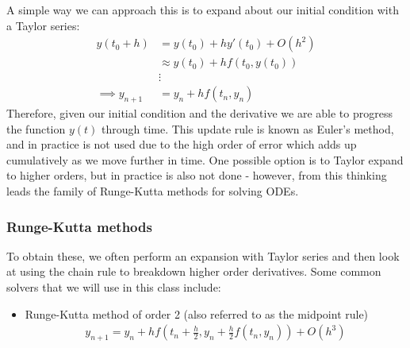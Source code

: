 \documentclass[11pt,a4paper]{report}
\begin{document}
			A simple way we can approach this is to expand about our initial condition with a Taylor series:
			\begin{align}
				y(t_0 + h) &= y(t_0) + hy'(t_0) + O(h^2) \\
				&\approx y(t_0) + h f(t_0, y(t_0)) \\
				&\vdots \\
				\implies y_{n+1} &= y_n + hf(t_n, y_n)
			\end{align}
			Therefore, given our initial condition and the derivative we are able to progress the function $y(t)$ through time. This update rule is known as Euler's method, and in practice is not used due to the high order of error which adds up cumulatively as we move further in time. One possible option is to Taylor expand to higher orders, but in practice is also not done - however, from this thinking leads the family of Runge-Kutta methods for solving ODEs.
			
			\subsubsection{Runge-Kutta methods}
			To obtain these, we often perform an expansion with Taylor series and then look at using the chain rule to breakdown higher order derivatives. Some common solvers that we will use in this class include:
			\begin{itemize}
				\item Runge-Kutta method of order 2 (also referred to as the midpoint rule)
				\begin{align}
					y_{n+1} = y_n + h f\left(t_n + \frac{h}{2}, y_n + \frac{h}{2} f(t_n,y_n)\right) + O(h^3)
				\end{align}
			\end{itemize}
\end{document}
